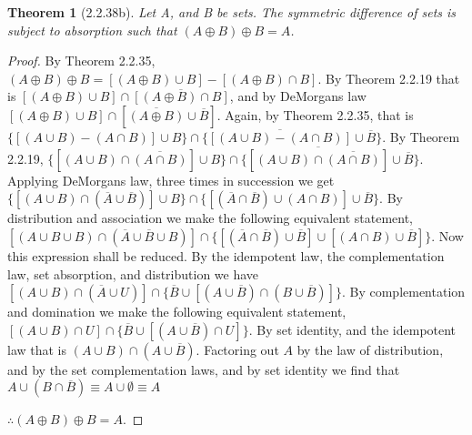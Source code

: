 \documentclass[a4paper, 12pt]{article}
\theoremstyle{plain}
\newtheorem*{theorem*}{Theorem}
\begin{document}
	
	\begin{theorem*}[2.2.38b]
		Let A, and B be sets. The symmetric difference of sets is subject to absorption such that $(A \oplus B) \oplus B = A$.
	\end{theorem*}

	\begin{proof}
		By Theorem 2.2.35, $(A \oplus B) \oplus B = [(A \oplus B) \cup B] - [(A \oplus B) \cap B]$. By Theorem 2.2.19 that is $[(A \oplus B) \cup B] \cap \overline{[(A \oplus B) \cap B]}$, and by DeMorgans law $[(A \oplus B) \cup B] \cap [\overline{(A \oplus B)} \cup \overline{B}]$. Again, by Theorem 2.2.35, that is \newline $\{[(A \cup B) - (A \cap B)] \cup B\} \cap \{\overline{[(A \cup B) - (A \cap B)]} \cup \overline{B}\}$. By Theorem 2.2.19, $\{[(A \cup B) \cap \overline{(A \cap B)}] \cup B\} \cap \{\overline{[(A \cup B) \cap \overline{(A \cap B)}]} \cup \overline{B}\}$. Applying DeMorgans law, three times in succession we get \newline $\{[(A \cup B) \cap (\overline{A} \cup \overline{B})] \cup B\} \cap \{[(\overline{A} \cap \overline{B}) \cup (A \cap B)] \cup \overline{B}\}$. By distribution and association we make the following equivalent statement, \newline $[(A \cup B \cup B) \cap (\overline{A} \cup \overline{B} \cup B)] \cap \{[(\overline{A} \cap \overline{B}) \cup \overline{B}] \cup [(A \cap B) \cup \overline{B}]\}$. Now this expression shall be reduced. By the idempotent law, the complementation law, set absorption, and distribution we have \newline $[(A \cup B) \cap (\overline{A} \cup U)] \cap \{\overline{B} \cup [(A \cup \overline{B}) \cap (B \cup \overline{B})]\}$. By complementation and domination we make the following equivalent statement, \newline $[(A \cup B) \cap U] \cap \{\overline{B} \cup [(A \cup \overline{B}) \cap U]\}$. By set identity, and the idempotent law that is $(A \cup B) \cap (A \cup \overline{B})$. Factoring out $A$ by the law of distribution, and by the set complementation laws, and by set identity we find that \newline $A \cup (B \cap \overline{B}) \equiv A \cup \emptyset \equiv A$ 
		
		$\therefore (A \oplus B) \oplus B = A$.
	\end{proof}
\end{document}
